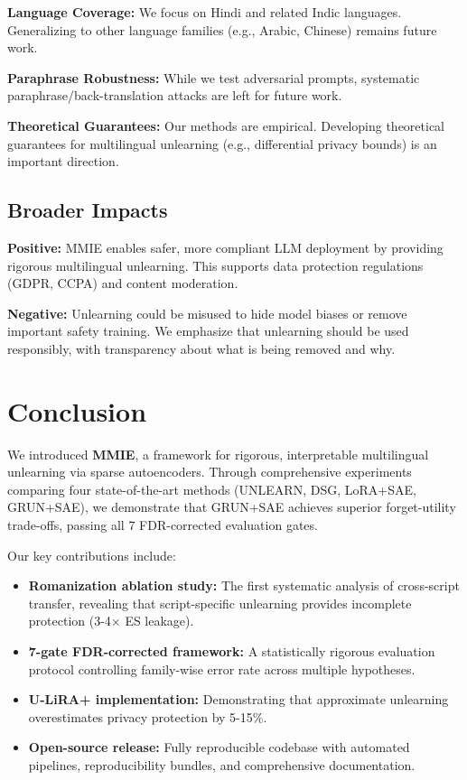 \documentclass[11pt]{article}
\begin{document}
\textbf{Language Coverage:} We focus on Hindi and related Indic languages. Generalizing to other language families (e.g., Arabic, Chinese) remains future work.

\textbf{Paraphrase Robustness:} While we test adversarial prompts, systematic paraphrase/back-translation attacks are left for future work.

\textbf{Theoretical Guarantees:} Our methods are empirical. Developing theoretical guarantees for multilingual unlearning (e.g., differential privacy bounds) is an important direction.

\subsection{Broader Impacts}

\textbf{Positive:} MMIE enables safer, more compliant LLM deployment by providing rigorous multilingual unlearning. This supports data protection regulations (GDPR, CCPA) and content moderation.

\textbf{Negative:} Unlearning could be misused to hide model biases or remove important safety training. We emphasize that unlearning should be used responsibly, with transparency about what is being removed and why.

\section{Conclusion}

We introduced \textbf{MMIE}, a framework for rigorous, interpretable multilingual unlearning via sparse autoencoders. Through comprehensive experiments comparing four state-of-the-art methods (UNLEARN, DSG, LoRA+SAE, GRUN+SAE), we demonstrate that GRUN+SAE achieves superior forget-utility trade-offs, passing all 7 FDR-corrected evaluation gates.

Our key contributions include:

\begin{itemize}
    \item \textbf{Romanization ablation study:} The first systematic analysis of cross-script transfer, revealing that script-specific unlearning provides incomplete protection (3-4× ES leakage).

    \item \textbf{7-gate FDR-corrected framework:} A statistically rigorous evaluation protocol controlling family-wise error rate across multiple hypotheses.

    \item \textbf{U-LiRA+ implementation:} Demonstrating that approximate unlearning overestimates privacy protection by 5-15\%.

    \item \textbf{Open-source release:} Fully reproducible codebase with automated pipelines, reproducibility bundles, and comprehensive documentation.
\end{itemize}
\end{document}
